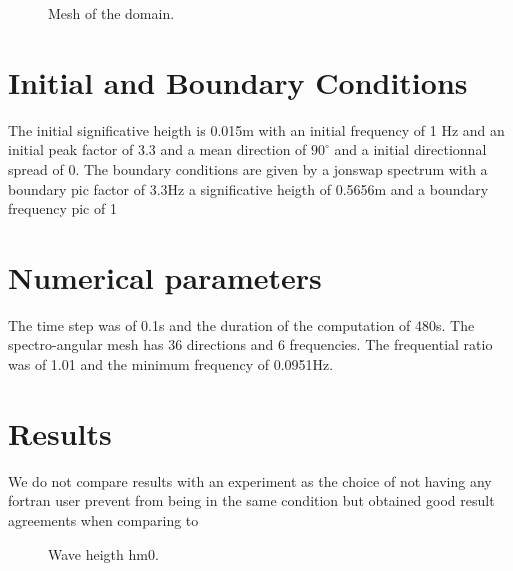 \begin{figure} [!h]
\centering
{}
 \caption{Mesh of the domain.}
\label{meshVeget}
\end{figure}
%
%
\section{Initial and Boundary Conditions}
%
The initial  significative heigth is 0.015m with an initial frequency of 1
Hz and an initial peak factor of 3.3 and a mean direction of $90^{\circ}$ and a
initial directionnal spread of 0.
The boundary conditions are given by a jonswap spectrum with a boundary pic
factor of 3.3Hz a significative heigth of 0.5656m and a boundary frequency
pic of 1

%
%
\section{Numerical parameters}
%
The time step was of 0.1s and the duration of the computation of 480s. The
spectro-angular mesh has 36 directions and 6 frequencies. The frequential
ratio was of 1.01 and the minimum frequency of 0.0951Hz.

\section{Results}
We do not compare results with an experiment as the choice of not having any
fortran user prevent from being in the same condition but \cite{Bacchi2014}
obtained good result agreements when comparing to \cite{Mendez2004}
\begin{figure} [!h]
\centering
{}
 \caption{Wave heigth hm0.}
\label{resVeget}
\end{figure}
